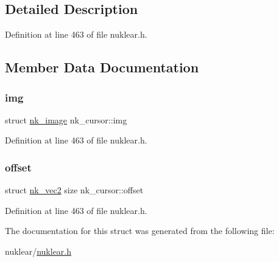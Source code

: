 \subsection{Detailed Description}


Definition at line 463 of file nuklear.\+h.



\subsection{Member Data Documentation}
\mbox{\label{structnk__cursor_ae85598fd872f474a4e63e92bbee10a92}} 
\subsubsection{\texorpdfstring{img}{img}}
{\footnotesize\ttfamily struct \mbox{\hyperlink{structnk__image}{nk\+\_\+image}} nk\+\_\+cursor\+::img}



Definition at line 463 of file nuklear.\+h.

\mbox{\label{structnk__cursor_ae01b7938eb679481a8ef549c27a59080}} 
\subsubsection{\texorpdfstring{offset}{offset}}
{\footnotesize\ttfamily struct \mbox{\hyperlink{structnk__vec2}{nk\+\_\+vec2}} size nk\+\_\+cursor\+::offset}



Definition at line 463 of file nuklear.\+h.



The documentation for this struct was generated from the following file\+:\begin{DoxyCompactItemize}
\item 
nuklear/\mbox{\hyperlink{nuklear_8h}{nuklear.\+h}}\end{DoxyCompactItemize}
